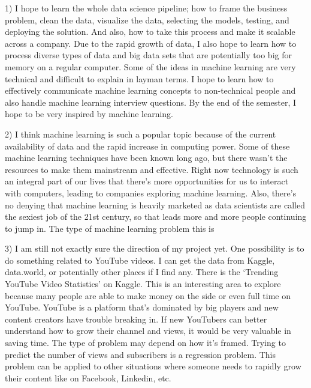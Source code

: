 \documentclass[11pt]{article}
\begin{document}

1) I hope to learn the whole data science pipeline; how to frame the business problem, clean the data, visualize the data, selecting the models, testing, and deploying the solution. And also, how to take this process and make it scalable across a company. Due to the rapid growth of data, I also hope to learn how to process diverse types of data and big data sets that are potentially too big for memory on a regular computer. Some of the ideas in machine learning are very technical and difficult to explain in layman terms. I hope to learn how to effectively communicate machine learning concepts to non-technical people and also handle machine learning interview questions. By the end of the semester,  I hope to be very inspired by machine learning.

2) I think machine learning is such a popular topic because of the current availability of data and the rapid increase in computing power. Some of these machine learning techniques have been known long ago, but there wasn't the resources to make them mainstream and effective. Right now technology is such an integral part of our lives that there's more opportunities for us to interact with computers, leading to companies exploring machine learning. Also, there's no denying that machine learning is heavily marketed as data scientists are called the sexiest job of the 21st century, so that leads more and more people continuing to jump in. The type of machine learning problem this is 

3) I am still not exactly sure the direction of my project yet. One possibility is to do something related to YouTube videos. I can get the data from Kaggle, data.world, or potentially other places if I find any. There is the ‘Trending YouTube Video Statistics’ on Kaggle. This is an interesting area to explore because many people are able to make money on the side or even full time on YouTube. YouTube is a platform that's dominated by big players and new content creators have trouble breaking in. If new YouTubers can better understand how to grow their channel and views, it would be very valuable in saving time.  The type of problem may depend on how it's framed. Trying to predict the number of views and subscribers is a regression problem. This problem can be applied to other situations where someone needs to rapidly grow their content like on Facebook, Linkedin, etc.
\end{document}
